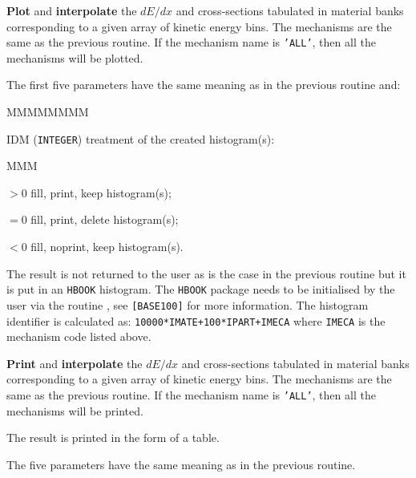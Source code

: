  
{\bf Plot} and {\bf interpolate} the $dE/dx$ and cross-sections
tabulated in material banks corresponding to a given array of kinetic
energy bins. The mechanisms are the same as the previous routine. 
If the mechanism name is {\tt 'ALL'}, then all the mechanisms will
be plotted.
 
The first five parameters have the same meaning as in the previous routine
and:
\begin{DLtt}{MMMMMMMM}
\item[IDM]({\tt INTEGER}) treatment of the created histogram(s):
\begin{DLtt}{MMM}
\item[$>0$]fill, print, keep histogram(s);
\item[$=0$]fill, print, delete histogram(s);
\item[$<0$]fill, noprint, keep histogram(s).
\end{DLtt}
\end{DLtt}
The result is not returned to the user as is the case in the previous
routine but it is put in an {\tt HBOOK} histogram. The {\tt HBOOK}
package needs to be initialised by the user via the routine ,
see {\tt [BASE100]} for more information.
The histogram identifier is calculated as: {\tt 10000*IMATE+100*IPART+IMECA}
where {\tt IMECA} is the mechanism code listed above.
 
 
{\bf Print} and {\bf interpolate} the $dE/dx$ and cross-sections
tabulated in material banks corresponding to a given array of kinetic
energy bins. The mechanisms are the same as the previous routine. 
If the mechanism name is {\tt 'ALL'}, then all the mechanisms will
be printed.

The result is printed in the form of a table.
 
The five parameters have the same meaning as in the previous routine.
